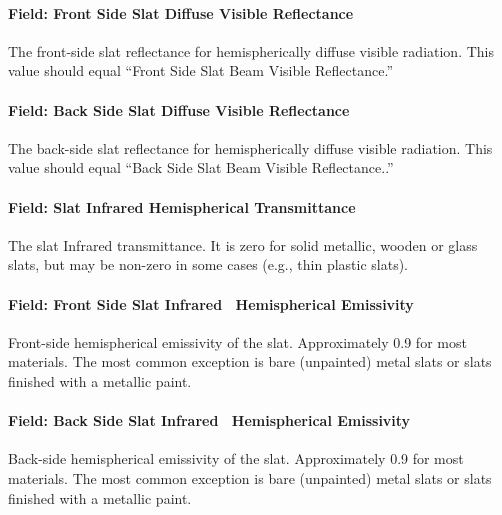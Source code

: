 \paragraph{Field: Front Side Slat Diffuse Visible Reflectance}\label{field-front-side-slat-diffuse-visible-reflectance}

The front-side slat reflectance for hemispherically diffuse visible radiation. This value should equal ``Front Side Slat Beam Visible Reflectance.''

\paragraph{Field: Back Side Slat Diffuse Visible Reflectance}\label{field-back-side-slat-diffuse-visible-reflectance}

The back-side slat reflectance for hemispherically diffuse visible radiation. This value should equal ``Back Side Slat Beam Visible Reflectance..''

\paragraph{Field: Slat Infrared Hemispherical Transmittance}\label{field-slat-infrared-hemispherical-transmittance}

The slat Infrared transmittance. It is zero for solid metallic, wooden or glass slats, but may be non-zero in some cases (e.g., thin plastic slats).

\paragraph{Field: Front Side Slat Infrared~ Hemispherical Emissivity}\label{field-front-side-slat-infrared-hemispherical-emissivity}

Front-side hemispherical emissivity of the slat. Approximately 0.9 for most materials. The most common exception is bare (unpainted) metal slats or slats finished with a metallic paint.

\paragraph{Field: Back Side Slat Infrared~ Hemispherical Emissivity}\label{field-back-side-slat-infrared-hemispherical-emissivity}

Back-side hemispherical emissivity of the slat. Approximately 0.9 for most materials. The most common exception is bare (unpainted) metal slats or slats finished with a metallic paint.

